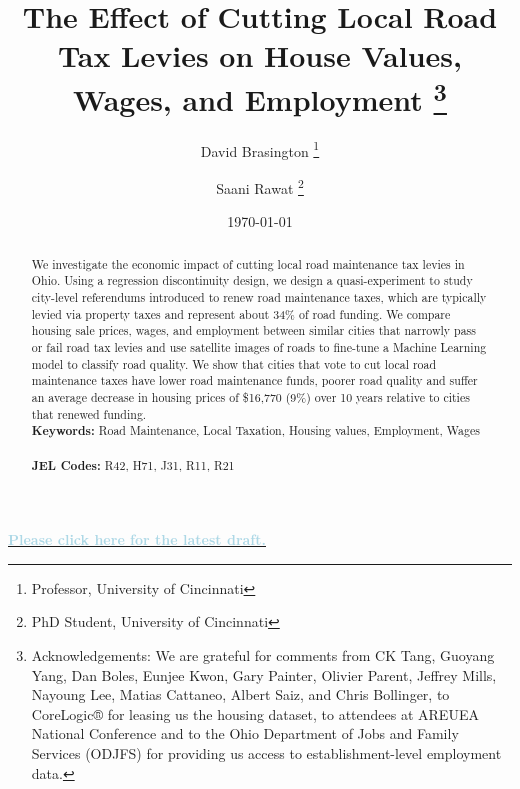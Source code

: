 \documentclass[12pt]{article}
\begin{document}
\begin{titlepage}
\title{The Effect of Cutting Local Road Tax Levies on House Values,  Wages, and Employment \thanks{Acknowledgements: We are grateful for comments from CK Tang, Guoyang Yang, Dan Boles, Eunjee Kwon, Gary Painter, Olivier Parent, Jeffrey Mills, Nayoung Lee, Matias Cattaneo, Albert Saiz, and Chris Bollinger, to CoreLogic® for leasing us the housing dataset, to attendees at AREUEA National Conference and to the Ohio Department of Jobs and Family Services (ODJFS) for providing us access to establishment-level employment data.}}
\author{David Brasington \thanks{Professor, University of Cincinnati} \and Saani Rawat \thanks{PhD Student, University of Cincinnati}}
\date{\today}
\maketitle

\noindent
\begin{center}
\textbf{\href{https://example.com/latest-draft}{\textcolor{lightblue}{Please click here for the latest draft.}}}
\end{center}

\begin{abstract}
\noindent     We investigate the economic impact of cutting local road maintenance tax levies in Ohio. Using a regression discontinuity design, we design a quasi-experiment to study city-level referendums introduced to renew road maintenance taxes, which are typically levied via property taxes and represent about 34\% of road funding. We compare housing sale prices, wages, and employment between similar cities that narrowly pass or fail road tax levies and use satellite images of roads to fine-tune a Machine Learning model to classify road quality. We show that cities that vote to cut local road maintenance taxes have lower road maintenance funds, poorer road quality and suffer an average decrease in housing prices of \$16,770 (9\%) over 10 years relative to cities that renewed funding. 
\vspace{0in}\\
\noindent\textbf{Keywords:} Road Maintenance, Local Taxation, Housing values, Employment, Wages \\
\vspace{0in}\\
\noindent\textbf{JEL Codes:} R42, H71, J31, R11, R21 \\

\bigskip
\end{abstract}
\setcounter{page}{0}
\thispagestyle{empty}
\end{titlepage}
\pagebreak \newpage
\end{document}
